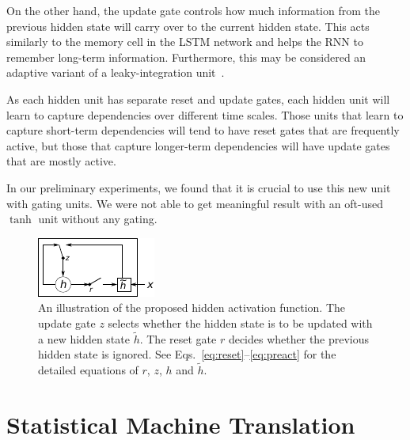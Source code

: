 On the other hand, the update gate controls how much information from the
previous hidden state will carry over to the current hidden state. This acts
similarly to the memory cell in the LSTM network and helps the RNN to remember long-term
information. Furthermore, this may be considered an adaptive variant of a
leaky-integration unit~\mbox{\cite{Bengio2013rec}}.

As each hidden unit has separate reset and update gates, each hidden unit will
learn to capture dependencies over different time scales. Those units that learn
to capture short-term dependencies will tend to have reset gates that are frequently
active, but those that capture longer-term dependencies will have update gates
that are mostly active.

In our preliminary experiments, we found that it is crucial to use this new unit
with gating units. We were not able to get meaningful result with an oft-used
$\tanh$ unit without any gating.

\begin{figure}
    \centering
    \includegraphics[width=0.7\columnwidth]{figures/hidden_unit.pdf}
    \caption{An illustration of the proposed hidden activation function. The
        update gate $z$ selects whether the hidden state is to be updated with a
        new hidden state $\tilde{h}$. The reset gate $r$ decides whether the
        previous hidden state is ignored. See
        Eqs.~\eqref{eq:reset}--\eqref{eq:preact} for the detailed equations of
        $r$, $z$, $h$ and $\tilde{h}$.}
    \label{fig:hidden}
    \vspace{-3mm}
\end{figure}


\section{Statistical Machine Translation}

